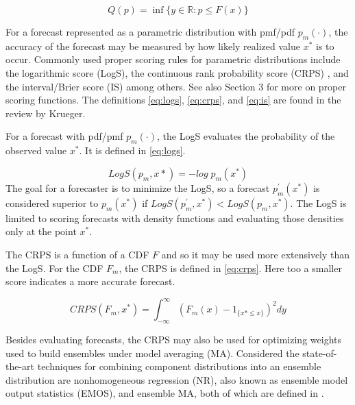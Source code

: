 \documentclass[11pt,notitlepage]{isuthesis}
\begin{document}
\begin{equation}
\label{eq:quant}
  Q(p) = \inf \{ y \in \mathbb{R} : p \leq F(x) \}
\end{equation}



For a forecast represented as a parametric distribution 
with pmf/pdf $p_m(\cdot)$, 
the accuracy of the forecast may be measured by how likely realized value $x^*$
is to occur. Commonly used proper scoring rules for parametric distributions
include the logarithmic score (LogS), the
continuous rank probability score (CRPS) \cite[]{hersbach2000decomposition}
\cite[]{alves2013ncep}, and the interval/Brier 
score (IS) \cite[]{gneiting2007strictly} among 
others. See also \cite[]{gneiting2014probabilistic}
Section 3 for more on proper scoring functions. The definitions 
\eqref{eq:logs}, \eqref{eq:crps}, and \eqref{eq:is} are found in the review by 
Krueger.

For a forecast with pdf/pmf $p_m(\cdot)$, the LogS evaluates the 
probability of the observed value $x^*$. It is defined in \eqref{eq:logs}.

\begin{equation}
\label{eq:logs}
  LogS(p_m,x*) = -log\;p_m(x^*)
\end{equation}
The goal for a forecaster is to minimize the LogS, so a forecast $p^{'}_m(x^*)$ 
is considered 
superior to $p_m(x^*)$ if
$LogS(p^{'}_m, x^*) < LogS(p_m, x^*)$.
The LogS is limited to scoring forecasts with density functions and
evaluating those densities only at the point $x^*$.

The CRPS is a function of a CDF $F$
and so it may
be used more extensively than the LogS. 
For the CDF $F_m$, the CRPS is defined in \eqref{eq:crps}.
Here too a smaller score indicates a more accurate forecast.

\begin{equation}
\label{eq:crps}
  CRPS(F_m, x^*) = \int_{-\infty}^{\infty} (F_m(x)- 1_{\{x*\leq x\}})^2 dy
\end{equation}


Besides evaluating forecasts, the CRPS may also be used for optimizing weights 
used
to build ensembles under model averaging (MA). Considered the 
state-of-the-art techniques for combining 
component distributions
into an ensemble distribution are nonhomogeneous regression (NR), also known as
ensemble model output statistics (EMOS), and ensemble
MA, both of which are defined in \cite[]{gneiting2014probabilistic}.
\end{document}

